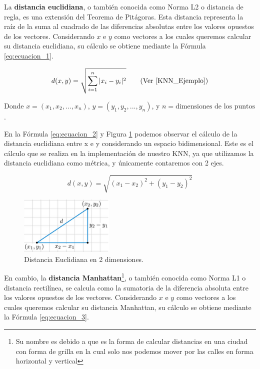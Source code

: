 \documentclass[12pt,a4paper]{article}
\begin{document}
\begin{sloppypar}
La \textbf{distancia euclidiana}, o también conocida como Norma L2 o distancia de regla, es una extensión del Teorema de Pitágoras. Esta distancia representa la raíz de la suma al cuadrado de las diferencias absolutas entre los valores opuestos de los vectores. Considerando $x$ e $y$ como vectores a los cuales queremos calcular su distancia euclidiana, su cálculo se obtiene mediante la Fórmula \ref{eq:ecuacion_1}.

\begin{equation}\label{eq:ecuacion_1}
d(x,y)=\sqrt{\sum_{i=1}^{n}|x_{i}-y_{i}|^2}   \qquad  \text{(Ver \cite{KNN_Ejemplo})}
\end{equation}

Donde $x=(x_{1},x_{2},..., x_{n})$, $y = (y_{1},y_{2},...,y_{n})$, y $n = \text{dimensiones de los puntos}$.

En la Fórmula \ref{eq:ecuacion_2} y Figura \ref{fig:KNN_2_Dim} podemos observar el cálculo de la distancia euclidiana entre x e y  considerando un espacio bidimensional. Este es el cálculo que se realiza en la implementación de nuestro KNN, ya que utilizamos la distancia euclidiana como métrica, y únicamente contaremos con 2 ejes.

\begin{equation}\label{eq:ecuacion_2}
d(x,y)=\sqrt{(x_{1}-x_{2})^2 + (y_{1}-y_{2})^2}
\end{equation}

\begin{figure}[H]    %
 \centering
 \includegraphics[width=0.4\textwidth]{images/KNN_2_Dim.png}
 \captionsetup{justification=centering,margin=2cm}
 \caption{Distancia Euclidiana en 2 dimensiones.} 
 \label{fig:KNN_2_Dim}
\end{figure}

En cambio, la \textbf{distancia Manhattan}\footnote{Su nombre es debido a que es la forma de calcular distancias en una ciudad con forma de grilla en la cual solo nos podemos mover por las calles en forma horizontal y vertical}, o también conocida como Norma L1 o distancia rectilínea, se calcula como la sumatoria de la diferencia absoluta entre los valores opuestos de los vectores.  Considerando $x$ e $y$ como vectores a los cuales queremos calcular su distancia Manhattan, su cálculo se obtiene mediante la Fórmula \ref{eq:ecuacion_3}.


\end{sloppypar}
\end{document}
